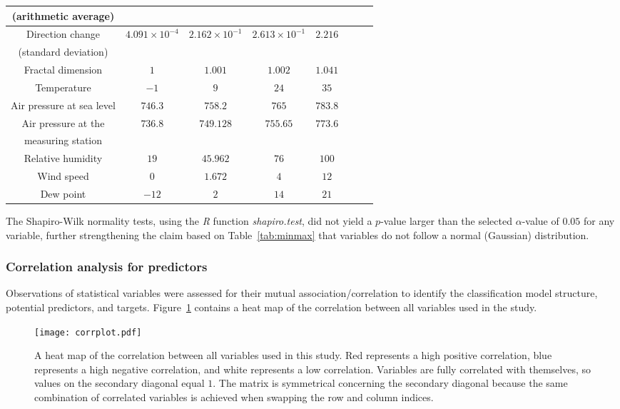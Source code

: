 \let\LaTeXcline\cline\documentclass[sn-mathphys-num]{sn-jnl}\let\cline\LaTeXcline
\begin{document}
\begin{table}[!ht]
\begin{tabular}{|c|c|c|c|c|c|c|c|}
            (arithmetic average) & & & & \\ \hline
            Direction change & \multirow{2}{*}{$4.091 \times 10^{-4}$} & \multirow{2}{*}{$2.162 \times 10^{-1}$} & \multirow{2}{*}{$2.613 \times 10^{-1}$} & \multirow{2}{*}{$2.216$} \\
             (standard deviation) & & & & \\ \hline
            Fractal dimension & $1$ & $1.001$ & $1.002$ & $1.041$ \\ \hline
            Temperature & $-1$ & $9$ & $24$ & $35$ \\ \hline
            Air pressure at sea level & $746.3$ & $758.2$ & $765$ & $783.8$ \\ \hline
            Air pressure at the & \multirow{2}{*}{$736.8$} & \multirow{2}{*}{$749.128$} & \multirow{2}{*}{$755.65$} & \multirow{2}{*}{$773.6$} \\
            measuring station & & & & \\ \hline
            Relative humidity & $19$ & $45.962$ & $76$ & $100$ \\ \hline
            Wind speed & $0$ & $1.672$ & $4$ & $12$ \\ \hline
            Dew point & $-12$ & $2$ & $14$ & $21$ \\ \hline
        \end{tabular}
\end{table}

The Shapiro-Wilk normality tests, using the \textit{R} function \textit{shapiro.test}, did not yield a $p$-value larger than the selected $\alpha$-value of $0.05$ for any variable, further strengthening the claim based on Table~\ref{tab:minmax} that variables do not follow a normal (Gaussian) distribution.

\subsubsection{Correlation analysis for predictors}

Observations of statistical variables were assessed for their mutual association/correlation to identify the classification model structure, potential predictors, and targets. Figure~\ref{fig:correlation} contains a heat map of the correlation between all variables used in the study.

\begin{figure}[!ht]
 \centering
 \texttt{[image: corrplot.pdf]}
    \caption{A heat map of the correlation between all variables used in this study. Red represents a high positive correlation, blue represents a high negative correlation, and white represents a low correlation. Variables are fully correlated with themselves, so values on the secondary diagonal equal $1$. The matrix is symmetrical concerning the secondary diagonal because the same combination of correlated variables is achieved when swapping the row and column indices.}
    \label{fig:correlation}
\end{figure}
\end{document}
